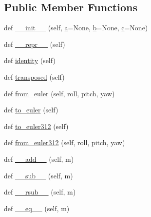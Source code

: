 \subsection*{Public Member Functions}
\begin{DoxyCompactItemize}
\item 
def \mbox{\hyperlink{classpymavlink_1_1rotmat_1_1Matrix3_abbd2600e17b922e8f1311dfdecd4ad10}{\+\_\+\+\_\+init\+\_\+\+\_\+}} (self, \mbox{\hyperlink{classpymavlink_1_1rotmat_1_1Matrix3_a6e59a3b14add2220f8a218e12d631464}{a}}=None, \mbox{\hyperlink{classpymavlink_1_1rotmat_1_1Matrix3_a4bb23872122a20e4b5a6de2e2a327a2f}{b}}=None, \mbox{\hyperlink{classpymavlink_1_1rotmat_1_1Matrix3_aaad9f3e5cf235b0922738d71dc08e6b7}{c}}=None)
\item 
def \mbox{\hyperlink{classpymavlink_1_1rotmat_1_1Matrix3_abfd504b096110e23400b43cc19ef53a3}{\+\_\+\+\_\+repr\+\_\+\+\_\+}} (self)
\item 
def \mbox{\hyperlink{classpymavlink_1_1rotmat_1_1Matrix3_a3ec58a383c67373271ee5df401123516}{identity}} (self)
\item 
def \mbox{\hyperlink{classpymavlink_1_1rotmat_1_1Matrix3_a2e4b87e4a5f9ad6c71b44393094e247e}{transposed}} (self)
\item 
def \mbox{\hyperlink{classpymavlink_1_1rotmat_1_1Matrix3_ab56d7d62a2e980b5528cadd6af6f273d}{from\+\_\+euler}} (self, roll, pitch, yaw)
\item 
def \mbox{\hyperlink{classpymavlink_1_1rotmat_1_1Matrix3_a19396c2c390f18faf6701318dba6817a}{to\+\_\+euler}} (self)
\item 
def \mbox{\hyperlink{classpymavlink_1_1rotmat_1_1Matrix3_a2c98ce17c4aea40f8de2ea1716000ea4}{to\+\_\+euler312}} (self)
\item 
def \mbox{\hyperlink{classpymavlink_1_1rotmat_1_1Matrix3_a0b834f239462597a080898e9528839a7}{from\+\_\+euler312}} (self, roll, pitch, yaw)
\item 
def \mbox{\hyperlink{classpymavlink_1_1rotmat_1_1Matrix3_af301b49689faf41d66a509e4cd2bfdbb}{\+\_\+\+\_\+add\+\_\+\+\_\+}} (self, m)
\item 
def \mbox{\hyperlink{classpymavlink_1_1rotmat_1_1Matrix3_aaf33cc183b0470c7fa2e20be34bbf1f9}{\+\_\+\+\_\+sub\+\_\+\+\_\+}} (self, m)
\item 
def \mbox{\hyperlink{classpymavlink_1_1rotmat_1_1Matrix3_a51a04b56f9927d460006b68f5156126c}{\+\_\+\+\_\+rsub\+\_\+\+\_\+}} (self, m)
\item 
def \mbox{\hyperlink{classpymavlink_1_1rotmat_1_1Matrix3_ae2ca508d27e007a96b7f669620949431}{\+\_\+\+\_\+eq\+\_\+\+\_\+}} (self, m)

\end{DoxyCompactItemize}
